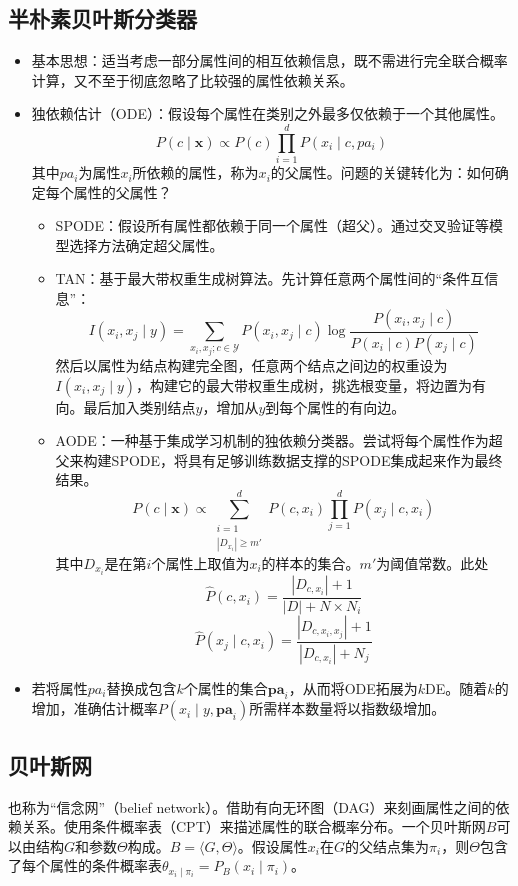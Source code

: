\documentclass{ctexart}
\begin{document}
				\subsection{半朴素贝叶斯分类器}
					\begin{itemize}
						\item 基本思想：适当考虑一部分属性间的相互依赖信息，既不需进行完全联合概率计算，又不至于彻底忽略了比较强的属性依赖关系。
						\item 独依赖估计（ODE）：假设每个属性在类别之外最多仅依赖于一个其他属性。\[P(c\mid\bm{x})\propto P(c)\prod_{i=1}^{d}P(x_i\mid c,pa_i)\]其中$pa_i$为属性$x_i$所依赖的属性，称为$x_i$的父属性。问题的关键转化为：如何确定每个属性的父属性？\begin{itemize}
							\item SPODE：假设所有属性都依赖于同一个属性（超父）。通过交叉验证等模型选择方法确定超父属性。
							\item TAN：基于最大带权重生成树算法。先计算任意两个属性间的``条件互信息''：\[I(x_i,x_j\mid y)=\sum_{x_i,x_j;c\in\mathcal{Y}}^{}P(x_i,x_j\mid c)\log\frac{P(x_i,x_j\mid c)}{P(x_i\mid c)P(x_j\mid c)}\]然后以属性为结点构建完全图，任意两个结点之间边的权重设为$I(x_i,x_j\mid y)$，构建它的最大带权重生成树，挑选根变量，将边置为有向。最后加入类别结点$y$，增加从$y$到每个属性的有向边。
							\item AODE：一种基于集成学习机制的独依赖分类器。尝试将每个属性作为超父来构建SPODE，将具有足够训练数据支撑的SPODE集成起来作为最终结果。\[P(c\mid\bm{x})\propto\sum_{\substack{i=1\\|D_{x_i}|\ge m'}}^{d}P(c,x_i)\prod_{j=1}^{d}P(x_j\mid c,x_i)\]其中$D_{x_i}$是在第$i$个属性上取值为$x_i$的样本的集合。$m'$为阈值常数。此处\[\hat{P}(c,x_i)=\frac{|D_{c,x_i}|+1}{|D|+N\times N_i}\]\[\hat{P}(x_j\mid c,x_i)=\frac{|D_{c,x_i,x_j}|+1}{|D_{c,x_i}|+N_j}\]
						\end{itemize}
						\item 若将属性$pa_i$替换成包含$k$个属性的集合$\bm{pa}_i$，从而将ODE拓展为$k$DE。随着$k$的增加，准确估计概率$P(x_i\mid y,\bm{pa}_i)$所需样本数量将以指数级增加。
					\end{itemize}
				\subsection{贝叶斯网}
					
					也称为``信念网''（belief network）。借助有向无环图（DAG）来刻画属性之间的依赖关系。使用条件概率表（CPT）来描述属性的联合概率分布。一个贝叶斯网$B$可以由结构$G$和参数$\Theta$构成。$B=\langle G,\Theta\rangle$。假设属性$x_i$在$G$的父结点集为$\pi_i$，则$\Theta$包含了每个属性的条件概率表$\theta_{x_i\mid\pi_i}=P_B(x_i\mid\pi_i)$。
\end{document}
